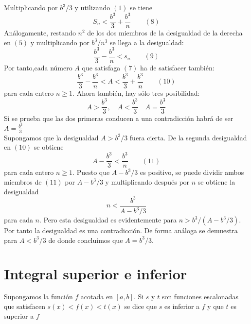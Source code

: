 \begin{multicols}{2}
Multiplicando por $b^3/3$ y utilizando $(1)$ se tiene $$S_n<\dfrac{b^3}{3}+\dfrac{b^3}{n} \qquad (8)$$
Análogamente, restando $n^2$ de los dos miembros de la desigualdad de la derecha en $(5)$ y multiplicando por $b^3/n^3$ se llega a la desigualdad:
$$\dfrac{b^3}{3}-\dfrac{b^3}{n}<s_n \qquad (9)$$
Por tanto,cada número $A$ que satisfaga $(7)$ ha de satisfacer también: $$\dfrac{b^3}{3}-\dfrac{b^3}{n}<A<\dfrac{b^3}{3}+\dfrac{b^3}{n} \qquad (10)$$ para cada entero $n\geq 1$. Ahora también, hay sólo tres posibilidad: $$A>\dfrac{b^3}{3}, \quad A<\dfrac{b^3}{3} \quad A=\dfrac{b^3}{3}$$
 Si se prueba que las dos primeras conducen a una contradicción habrá de ser $A=\frac{b^3}{3}$\\
 Supongamos que la desigualdad $A>b^3/3$ fuera cierta. De la segunda desigualdad en $(10)$ se obtiene $$A-\dfrac{b^3}{3}<\dfrac{b^3}{n} \qquad (11)$$ para cada entero $n\geq 1$. Puesto que $A-b^3/3$ es positivo, se puede dividir ambos miembros de $(11)$ por $A-b^3/3$ y multiplicando después por $n$ se obtiene la desigualdad $$n<\dfrac{b^3}{A-b^3/3}$$ para cada $n$. Pero esta desigualdad es evidentemente para $n>b^3/(A-b^3/3).$ Por tanto la desigualdad es una contradicción. De forma análoga se demuestra para $A<b^3/3$ de donde concluimos que $A=b^3/3$.


\section*{Integral superior e inferior}

\begin{tcolorbox}[colframe=white]
    \begin{def.}
	Supongamos la función $f$ acotada en $[a,b]$. Si $s$ y $t$ son funciones escalonadas que satisfacen $s(x)<f(x)<t(x)$ se dice que $s$ es inferior a $f$ y que $t$ es superior a $f$
    \end{def.}
\end{tcolorbox}


\end{multicols}
